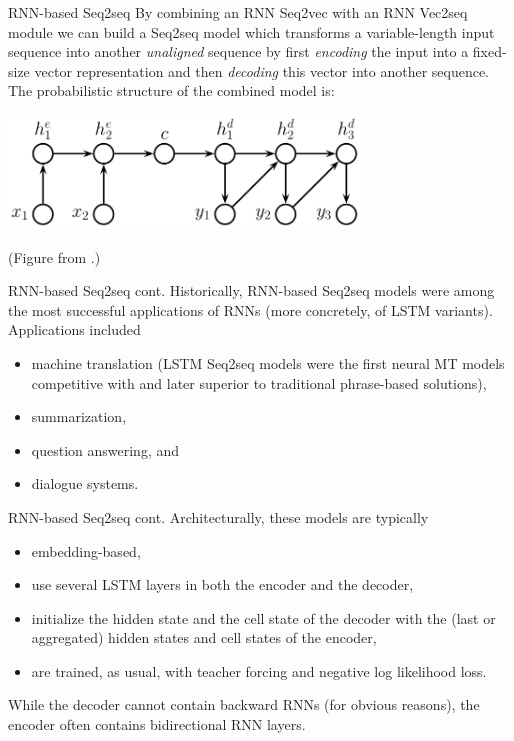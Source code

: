 \documentclass[style=upen, size=14pt]{powerdot}
\newcommand{\gold}{\color{arany}}
\theoremstyle{definition}
\begin{document}
\begin{slide}{RNN-based Seq2seq}
  By combining an RNN Seq2vec with an RNN Vec2seq module we can build a Seq2seq
  model which transforms a variable-length input sequence into another
  \emph{unaligned} sequence by first \emph{\gold encoding} the input into a
  fixed-size vector representation and then \emph{\gold decoding} this vector
  into another sequence. The probabilistic structure of the combined model is:
  \begin{center}
    \includegraphics[width=0.7\textwidth]{figures/seq2seq_prob.eps}
    
    \footnotesize{(Figure from \cite{murphy2021pml}.)}
  \end{center}
\end{slide}

\begin{slide}[toc=]{RNN-based Seq2seq cont.}
  Historically, RNN-based Seq2seq models were among the most successful
  applications of RNNs (more concretely, of LSTM variants). Applications
  included

  \begin{itemize}
  \item machine translation (LSTM Seq2seq models were the first neural MT models
    competitive with and later superior to traditional phrase-based solutions),
  \item summarization,
  \item question answering, and
  \item dialogue systems.
  \end{itemize}
\end{slide}

\begin{slide}[toc=]{RNN-based Seq2seq cont.}
  Architecturally, these models are typically
  \begin{itemize}
  \item embedding-based,
  \item use several LSTM layers in both the encoder and the decoder,
  \item initialize the hidden state and the cell state of the decoder with the
    (last or aggregated) hidden states and cell states of the encoder,
  \item are trained, as usual, with teacher forcing and negative log likelihood
    loss.
  \end{itemize}
  While the decoder cannot contain backward RNNs (for obvious reasons), the
  encoder often contains bidirectional RNN layers.
\end{slide}
\end{document}
